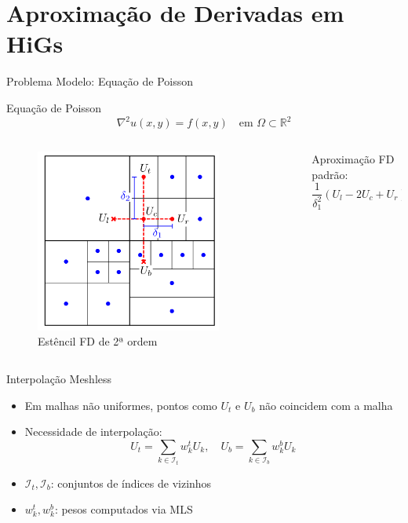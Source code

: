 \documentclass[../main/main.tex]{subfiles}
\begin{document}
\section{Aproximação de Derivadas em HiGs}

\begin{frame}{Problema Modelo: Equação de Poisson}
\begin{block}{Equação de Poisson}
\[
\nabla^2 u(x, y) = f(x, y) \quad \text{em } \Omega \subset \mathbb{R}^2
\]
\end{block}

\begin{columns}[T]
\begin{column}{0.5\textwidth}
\begin{figure}
\centering
\includegraphics[width=0.8\textwidth]{imgs/figura2.png}
\caption{Estêncil FD de 2ª ordem}
\end{figure}
\end{column}
\begin{column}{0.5\textwidth}
Aproximação FD padrão:
\[
\frac{1}{\delta_1^2}(U_l - 2U_c + U_r) + \frac{1}{\delta_2^2}(U_t - 2U_c + U_b) = f_c
\]
\end{column}
\end{columns}
\end{frame}

\begin{frame}{Interpolação Meshless}
\begin{itemize}
\item Em malhas não uniformes, pontos como $U_t$ e $U_b$ não coincidem com a malha
\item Necessidade de interpolação:
\[
U_t = \sum_{k \in \mathcal{I}_t} w_k^t U_k, \quad U_b = \sum_{k \in \mathcal{I}_b} w_k^b U_k
\]
\item $\mathcal{I}_t, \mathcal{I}_b$: conjuntos de índices de vizinhos
\item $w_k^t, w_k^b$: pesos computados via MLS
\end{itemize}
\end{frame}
\end{document}
